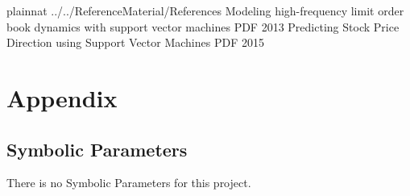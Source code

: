 \documentclass[12pt]{article}
\begin{document}



\newpage

 {plainnat}
 {../../ReferenceMaterial/References}
Modeling high-frequency limit order book dynamics with support vector machines  PDF 2013
Predicting Stock Price Direction using Support Vector Machines PDF 2015
\newpage

\section{Appendix}


\subsection{Symbolic Parameters}

There is no Symbolic Parameters for this project.
\end{document}
